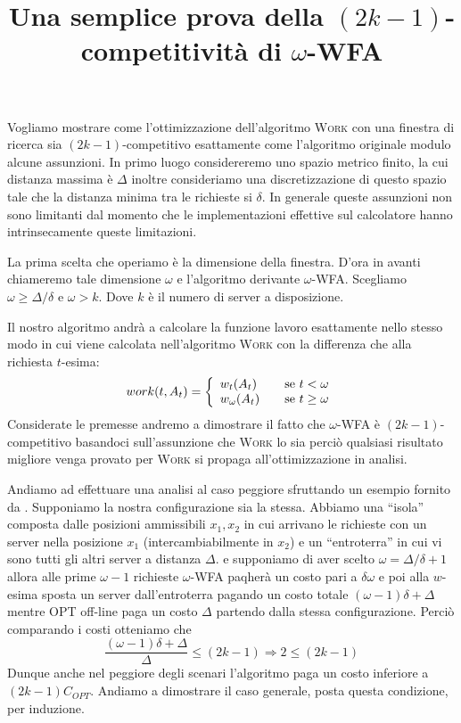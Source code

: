 \documentclass[a4paper, 11pt]{article}
\begin{document}
\title{Una semplice prova della $(2k - 1)$-competitività di $\omega$-WFA}
\maketitle

Vogliamo mostrare come l'ottimizzazione dell'algoritmo \textsc{Work} con una 
finestra di ricerca sia $(2k - 1)$-competitivo esattamente come l'algoritmo 
originale modulo alcune assunzioni. In primo luogo considereremo uno spazio
metrico finito, la cui distanza massima è $\Delta$ inoltre consideriamo una
discretizzazione di questo spazio tale che la distanza minima tra le richieste
si $\delta$. In generale queste assunzioni non sono limitanti dal momento che 
le implementazioni effettive sul calcolatore hanno intrinsecamente queste 
limitazioni.

La prima scelta che operiamo è la dimensione della finestra. D'ora in avanti 
chiameremo tale dimensione $\omega$ e l'algoritmo derivante $\omega$-WFA. 
Scegliamo $\omega \geq \Delta/\delta$ e $\omega > k$. Dove $k$ è il numero di 
server a disposizione. 

Il nostro algoritmo andrà a calcolare la funzione lavoro esattamente nello 
stesso modo in cui viene calcolata nell'algoritmo \textsc{Work} con la 
differenza che alla richiesta $t$-esima:
\[
    work(t, A_t) = 
    \left\{ \begin{array}{l l}
        w_t(A_t) & \quad \text{se } t < \omega\\
        w_\omega(A_t) & \quad \text{se } t \geq \omega \\
    \end{array}\right.
\]
Considerate le premesse andremo a dimostrare il fatto che $\omega$-WFA è 
$(2k - 1)$-competitivo basandoci sull'assunzione che \textsc{Work} lo sia
perciò qualsiasi risultato migliore venga provato per \textsc{Work} si propaga
all'ottimizzazione in analisi.

Andiamo ad effettuare una analisi al caso peggiore sfruttando un esempio fornito
da \cite{rudec}. Supponiamo la nostra configurazione sia la stessa. Abbiamo una 
``isola'' composta dalle posizioni ammissibili $x_1, x_2$ in cui arrivano le 
richieste con un server nella posizione $x_1$ (intercambiabilmente in $x_2$) 
e un ``entroterra'' in cui vi sono tutti gli altri server a distanza $\Delta$. 
e supponiamo di aver scelto $\omega = \Delta / \delta + 1$ allora alle prime 
$\omega - 1$ richieste $\omega$-WFA paqherà un costo pari a $\delta \omega$ e 
poi alla $w$-esima sposta un server dall'entroterra pagando un costo totale 
$(\omega - 1)\delta + \Delta$ mentre OPT off-line paga un costo $\Delta$ 
partendo dalla stessa configurazione. Perciò comparando i costi otteniamo che 
\[
    \frac{(\omega - 1) \delta + \Delta}{\Delta} \leq (2k -1) \Rightarrow 
    2  \leq (2k - 1)
\]
Dunque anche nel peggiore degli scenari l'algoritmo paga un costo inferiore 
a $(2k - 1)C_{OPT}$. Andiamo a dimostrare il caso generale, posta questa 
condizione, per induzione.
\end{document}
